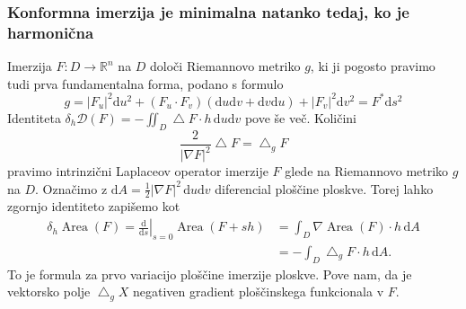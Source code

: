 \documentclass[8pt]{beamer}
\theoremstyle{definition}
\theoremstyle{remark}
\theoremstyle{plain}
\numberwithin{equation}{section}  %
\begin{document}
\begin{frame}
    \frametitle{Konformna imerzija je minimalna natanko tedaj, ko je harmonična}

    Imerzija $F: D \rightarrow \mathbb{R}^n$ na $D$ določi Riemannovo metriko $g$, ki ji pogosto pravimo tudi prva fundamentalna forma, podano s formulo
    \begin{equation*}
        g=\left|F_u\right|^2 \mathrm{d} u^2+\left(F_u \cdot F_v\right)(\mathrm{d} u \mathrm{d} v+\mathrm{d} v \mathrm{d} u)+\left|F_v\right|^2 \mathrm{d} v^2 = F^* \mathrm{d}s^2    
    \end{equation*}
    Identiteta $\delta_h \mathscr{D}(F)=-\iint_D \bigtriangleup F \cdot h \, \mathrm{d} u \mathrm{d} v$ pove še več. Količini
    \begin{equation*}
        \frac{2}{\left| \nabla F\right|^2} \bigtriangleup F=\bigtriangleup_g F       
    \end{equation*}
    pravimo intrinzični Laplaceov operator imerzije $F$ glede na Riemannovo metriko $g$ na $D$. Označimo z $\mathrm{d} A=\frac{1}{2}|\nabla F|^2 \, \mathrm{d} u \mathrm{d} v$ diferencial ploščine ploskve. Torej lahko zgornjo identiteto zapišemo kot 
    \begin{align*}
        \delta_h \operatorname{Area}(F)=\left.\frac{\mathrm{d}}{\mathrm{d} s}\right|_{s=0} \operatorname{Area}(F+s h)&=\int_D \nabla \operatorname{Area}(F) \cdot h \, \mathrm{d} A \\
        &=-\int_D \bigtriangleup_g F \cdot h \, \mathrm{d} A.    
    \end{align*}
    To je \textcolor{red1}{formula za prvo variacijo ploščine} imerzije ploskve. Pove nam, da je \textcolor{red1}{vektorsko polje} $\bigtriangleup_g X$ \textcolor{red1}{negativen gradient ploščinskega funkcionala v} $F$.  

\end{frame}
\end{document}
